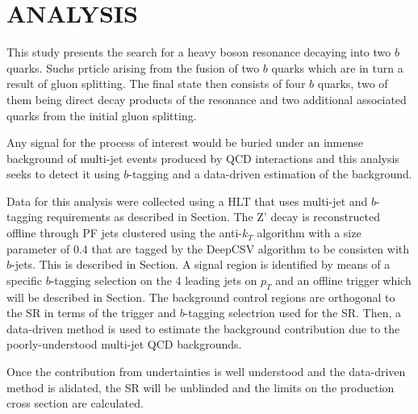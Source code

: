 %
%
%
%



\chapter{ANALYSIS \label{cha:analysis}}

This study presents the search for a heavy boson resonance decaying into two $b$ quarks. Suchs prticle arising from the fusion of two $b$ quarks which are in turn a result of gluon splitting. The final state then consists of four $b$ quarks, two of them being direct decay products of the resonance and two additional associated quarks from the initial gluon splitting.

Any signal for the process of interest would be buried under an inmense background of multi-jet events produced by QCD interactions and this analysis seeks to detect it using $b$-tagging and a data-driven estimation of the background.

Data for this analysis were collected using a HLT that uses multi-jet and $b$-tagging requirements as described in Section. The Z' decay is reconstructed offline through PF jets clustered using the anti-$k_{T}$ algorithm with a size parameter of 0.4 that are tagged by the DeepCSV algorithm to be consisten with $b$-jets. This is described in Section. A signal region is identified by means of a specific $b$-tagging selection on the 4 leading jets on $p_{T}$ and an offline trigger which will be described in Section. The background control regions are orthogonal to the SR in terms of the trigger and $b$-tagging selectrion used for the SR. Then, a data-driven method is used to estimate the background contribution due to the poorly-understood multi-jet QCD backgrounds. 

Once the contribution from undertainties is well understood and the data-driven method is alidated, the SR will be unblinded and the limits on the production cross section are calculated.

